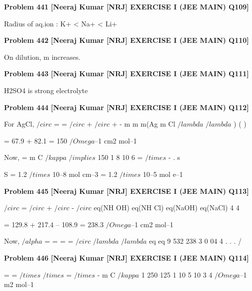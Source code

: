 \begin{problembox}
\textbf{Problem 441} \hfill \textbf{[Neeraj Kumar [NRJ] EXERCISE I (JEE MAIN) Q109]}
\label{q:ext-nrj_all_questions-441}

Radius of aq.ion : K+ < Na+ < Li+
\end{problembox}

\begin{problembox}
\textbf{Problem 442} \hfill \textbf{[Neeraj Kumar [NRJ] EXERCISE I (JEE MAIN) Q110]}
\label{q:ext-nrj_all_questions-442}

On dilution,  m increases.
\end{problembox}

\begin{problembox}
\textbf{Problem 443} \hfill \textbf{[Neeraj Kumar [NRJ] EXERCISE I (JEE MAIN) Q111]}
\label{q:ext-nrj_all_questions-443}

H2SO4 is strong electrolyte
\end{problembox}

\begin{problembox}
\textbf{Problem 444} \hfill \textbf{[Neeraj Kumar [NRJ] EXERCISE I (JEE MAIN) Q112]}
\label{q:ext-nrj_all_questions-444}

For AgCl,  $/circ$
=  
=
$/circ$
+ $/circ$
+
-
m
m
m(Ag
m Cl
$/lambda$
$/lambda$
)
(
)
 
 = 67.9 + 82.1 = 150 $/Omega$--1 cm2 mol--1
 
 Now,  
=
m
C
$/kappa$ $/implies$ 150
1 8 10 6
=
$/times$
-
.
s
 
   S = 1.2 $/times$ 10--8 mol cm--3 = 1.2 $/times$ 10--5 mol e--1
\end{problembox}

\begin{problembox}
\textbf{Problem 445} \hfill \textbf{[Neeraj Kumar [NRJ] EXERCISE I (JEE MAIN) Q113]}
\label{q:ext-nrj_all_questions-445}

 $/circ$
=  $/circ$
+  $/circ$
- $/circ$
eq(NH OH)
eq(NH Cl)
eq(NaOH)
eq(NaCl)
4
4
 
 
 = 129.8 + 217.4 -- 108.9 = 238.3 $/Omega$--1 cm2 mol--1
 
 Now, $/alpha$ =
=
=
=
$/circ$
$/lambda$
$/lambda$
eq
eq
9 532
238 3
0 04
4
.
.
.
/%
\end{problembox}

\begin{problembox}
\textbf{Problem 446} \hfill \textbf{[Neeraj Kumar [NRJ] EXERCISE I (JEE MAIN) Q114]}
\label{q:ext-nrj_all_questions-446}

 
=
=
$/times$
$/times$
=
$/times$
-
m
C
$/kappa$
1
250 125
1 10
5 10
3
4 $/Omega$--1 m2 mol--1
\end{problembox}

